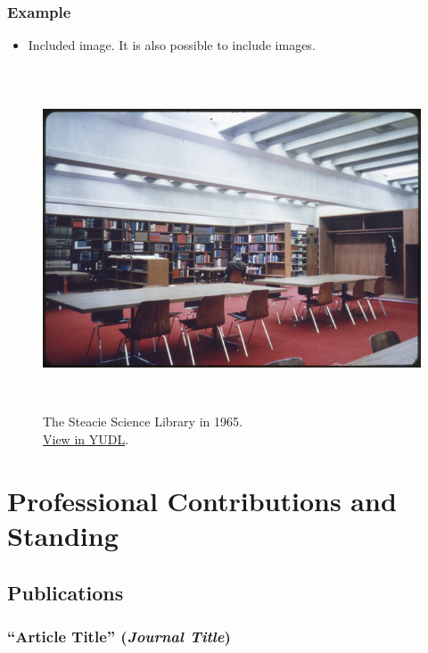 \documentclass[12pt,oneside]{book}
\begin{document}
\subsection{Example}

\begin{itemize}
  \item Included image.  It is also possible to include images.
\end{itemize}

\begin{figure}[H]
  \includegraphics[height=4in]{images/yul 1121686_Medium_sized_JPEG.jpg}
  \caption{The Steacie Science Library in 1965. \\ \href{https://digital.library.yorku.ca/yul-1121686/steacie-science-library-interior-view}{View in YUDL}.}
\end{figure}

\newpage

\renewcommand\thechapter{B}
\chapter{Professional Contributions and Standing}

\section{Publications}

\subsection{``Article Title'' (\textit{Journal Title})}
\end{document}
